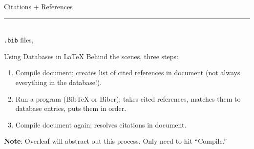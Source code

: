 \documentclass{beamer}
\begin{document}
{  \begin{frame}[plain]
    \vfill
    \centering
    \begin{beamercolorbox}[sep=8pt,center,shadow=true,rounded=true]{Citations + References}
      \insertsectionhead\par%
      \color{davisblue}\noindent\rule{10cm}{1pt} \\
      \footnotesize{\texttt{.bib} files, }
    \end{beamercolorbox}
    \vfill
  \end{frame}


  \begin{frame}{Using Databases in \LaTeX}
    Behind the scenes, three steps:
    \begin{enumerate}
      \item Compile document; creates list of cited references in document (not always everything in the database!).
      \item Run a program (BibTeX or Biber); takes cited references, matches them to database entries, puts them in order.
      \item Compile document again; resolves citations in document.
    \end{enumerate}
    \textbf{Note}: Overleaf will abstract out this process. Only need to hit ``Compile.''
  \end{frame}

}
\end{document}

